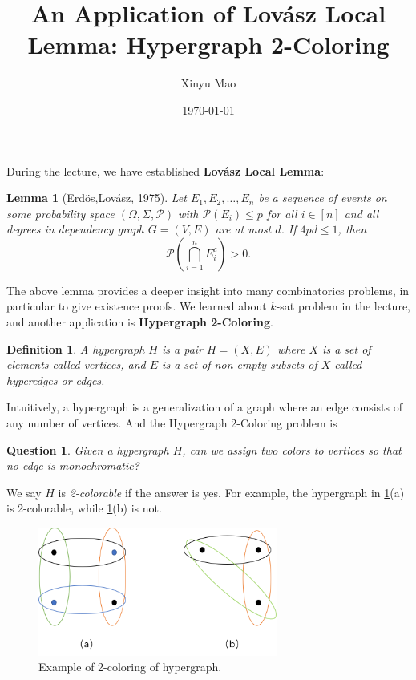 \documentclass[12pt]{article}
\title{An Application of Lovász Local Lemma: Hypergraph 2-Coloring}
\author{Xinyu Mao}
\date{\today}
\newtheorem{lemma}[theorem]{Lemma}
\newtheorem{question}[theorem]{Question}
\newtheorem{definition}[theorem]{Definition}
\newcommand\pp{\mathcal{P}}
\newcommand\pr[1]{\mathcal{P} \left( #1\right)}
\begin{document}
\maketitle
During the lecture, we have established \textbf{Lovász Local Lemma}:
\begin{lemma}[Erdös,Lovász, 1975] \label{LLL}
    Let $E_1,E_2,\dots,E_n$ be a sequence of events 
    on some probability space $(\Omega, \Sigma, \pp)$
    with $\pp(E_i) \leq p$ for all $i \in [n]$ and 
    all degrees in dependency graph $G = (V,E)$ are at most $d$.
    If $4pd \leq 1$, then 
    $$
        \pr{\bigcap_{i = 1}^n E_i^c} > 0.
    $$
\end{lemma}
The above lemma provides a deeper insight into many combinatorics problems, 
in particular to give existence proofs.  
We learned about $k$-sat problem in the lecture, 
and another application is \textbf{Hypergraph 2-Coloring}.

\begin{definition}
    A hypergraph $H$ is a pair $H = (X,E)$ 
    where $X$ is a set of elements called vertices, and 
    $E$ is a set of non-empty subsets of $X$ called hyperedges or edges.
\end{definition}
Intuitively, a hypergraph is a generalization of a graph where an edge 
consists of any number of vertices.
And the Hypergraph 2-Coloring problem is
\begin{question}
    Given a hypergraph $H$, can we assign two colors to vertices
    so that no edge is monochromatic?
\end{question}
We say $H$ is \textit{2-colorable} if the answer is yes. For example, the hypergraph in \cref{ex}(a) is 2-colorable,
while \cref{ex}(b) is not.
\begin{figure}[h]
    \centering
    \includegraphics[width = 0.7\textwidth]{ex.png}
    \caption{Example of 2-coloring of hypergraph.}
    \label{ex}
\end{figure} 
\end{document}
